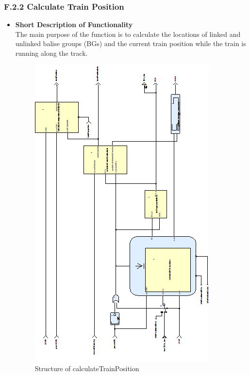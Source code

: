 \subsubsection{F.2.2 Calculate Train Position}\label{sss:calctrainpos}

\begin{itemize}
\item \textbf{Short Description of Functionality}\\
The main purpose of the function is to calculate the locations of linked and unlinked balise groups (BGs) and the current train position while the train is running along the track. 

\begin{figure}[hbtp]
\centering
\includegraphics[scale=1]{../images/CalculateTrainPosition.png}
\caption{Structure of calculateTrainPosition}
\end{figure}



\end{itemize}
